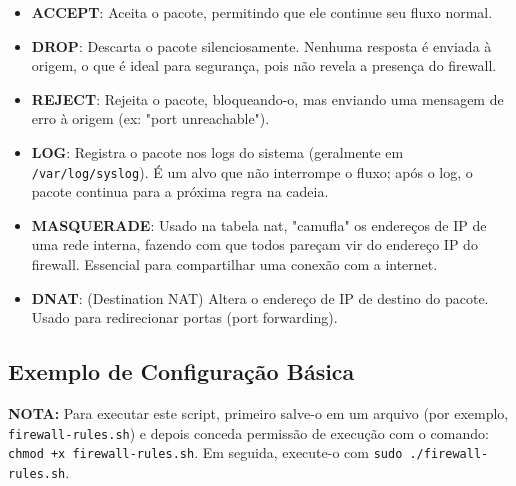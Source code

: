 ﻿\documentclass[12pt,fleqn]{article}
\begin{document}
\begin{itemize}
    \item \textbf{ACCEPT}: Aceita o pacote, permitindo que ele continue seu fluxo normal.
    
    \item \textbf{DROP}: Descarta o pacote silenciosamente. Nenhuma resposta é enviada à origem, o que é ideal para segurança, pois não revela a presença do firewall.
    
    \item \textbf{REJECT}: Rejeita o pacote, bloqueando-o, mas enviando uma mensagem de erro à origem (ex: "port unreachable").
    
    \item \textbf{LOG}: Registra o pacote nos logs do sistema (geralmente em \texttt{/var/log/syslog}). É um alvo que não interrompe o fluxo; após o log, o pacote continua para a próxima regra na cadeia.
    
    \item \textbf{MASQUERADE}: Usado na tabela nat, "camufla" os endereços de IP de uma rede interna, fazendo com que todos pareçam vir do endereço IP do firewall. Essencial para compartilhar uma conexão com a internet.
    
    \item \textbf{DNAT}: (Destination NAT) Altera o endereço de IP de destino do pacote. Usado para redirecionar portas (port forwarding).
\end{itemize}

\subsection{Exemplo de Configuração Básica}

\textbf{NOTA:} Para executar este script, primeiro salve-o em um arquivo (por exemplo, \texttt{firewall-rules.sh}) e depois conceda permissão de execução com o comando: \texttt{chmod +x firewall-rules.sh}. Em seguida, execute-o com \texttt{sudo ./firewall-rules.sh}.
\end{document}
